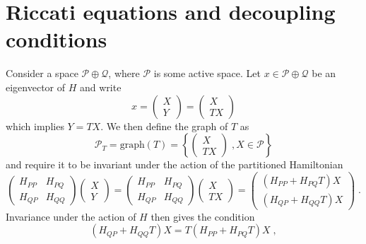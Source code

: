 \documentclass[aip,jcp,reprint,noshowkeys,superscriptaddress]{revtex4-1}
\begin{document}
\section{Riccati equations and decoupling conditions}
\label{app:Riccati}
Consider a space $\mathcal{P}\oplus\mathcal{Q}$, where $\mathcal{P}$ is
some active space. Let $x\in\mathcal{P}\oplus\mathcal{Q}$ be an
eigenvector of $H$ and write 
\begin{equation}
	x = 
	\begin{pmatrix}
		X \\
		Y 
	\end{pmatrix} = 
	\begin{pmatrix}
		X \\
		TX 
	\end{pmatrix}	
	\end{equation} 
which implies $Y = TX$. We then define the graph of $T$ as
\begin{equation}
	\mathcal{P}_T = \text{graph}(T) = 
	\left\{
	\begin{pmatrix}
		X \\
		TX 
	\end{pmatrix}	\;, X \in \mathcal{P}
	\right\}
\end{equation}
and require it to be invariant under the action of the partitioned Hamiltonian 
\begin{equation}
	\begin{pmatrix}
		H_{PP} & H_{PQ} \\ H_{QP} & H_{QQ}
	\end{pmatrix}
	\begin{pmatrix}
		X \\
		Y 
	\end{pmatrix}		= 
	\begin{pmatrix}
		H_{PP} & H_{PQ} \\ H_{QP} & H_{QQ}
	\end{pmatrix}
	\begin{pmatrix}
		X \\
		TX 
	\end{pmatrix} =
	\begin{pmatrix}
		\left(H_{PP} + H_{PQ}T\right)X \\
		\left(H_{QP} + H_{QQ}T \right)X
	\end{pmatrix}	\;.	
\end{equation}
Invariance under the action of $H$ then gives the condition 
\begin{equation}
	\left(H_{QP} + H_{QQ}T\right)X = T\left(H_{PP} + H_{PQ}T \right)X \;,
\end{equation}
\end{document}
